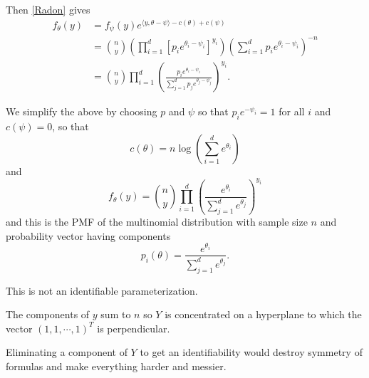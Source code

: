 \documentclass[
  ignorenonframetext,
]{beamer}
\begin{document}
\begin{frame}{}
\protect\hypertarget{section-6}{}
Then \eqref{Radon} gives \begin{align*}
  f_{\theta}(y) &= f_{\psi}(y)e^{\langle y,\theta-\psi\rangle - c(\theta) + c(\psi)} \\
    &= {n \choose y} \left(\prod_{i=1}^d\left[p_ie^{\theta_i-\psi_i}\right]^{y_i}\right)\left(\sum_{i=1}^d p_ie^{\theta_i-\psi_i}\right)^{-n} \\
    &= {n \choose y} \prod_{i=1}^d \left(\frac{p_ie^{\theta_i-\psi_i}}{\sum_{j=1}^dp_je^{\theta_j-\psi_j}}\right)^{y_i}.
\end{align*}
\end{frame}

\begin{frame}{}
\protect\hypertarget{section-7}{}
We simplify the above by choosing \(p\) and \(\psi\) so that
\(p_ie^{-\psi_i} = 1\) for all \(i\) and \(c(\psi) = 0\), so that \[
  c(\theta) = n\log\left(\sum_{i=1}^d e^{\theta_i}\right)
\] and \[
  f_{\theta}(y) = {n \choose y}\prod_{i=1}^d \left(\frac{e^{\theta_i}}{\sum_{j=1}^d e^{\theta_j}}\right)^{y_i}
\] and this is the PMF of the multinomial distribution with sample size
\(n\) and probability vector having components \[
  p_i(\theta) = \frac{e^{\theta_i}}{\sum_{j=1}^d e^{\theta_j}}.
\]
\end{frame}

\begin{frame}{}
\protect\hypertarget{section-8}{}
This is not an identifiable parameterization.

The components of \(y\) sum to \(n\) so \(Y\) is concentrated on a
hyperplane to which the vector \((1,1, \cdots, 1)^T\) is perpendicular.

Eliminating a component of \(Y\) to get an identifiability would destroy
symmetry of formulas and make everything harder and messier.
\end{frame}
\end{document}
